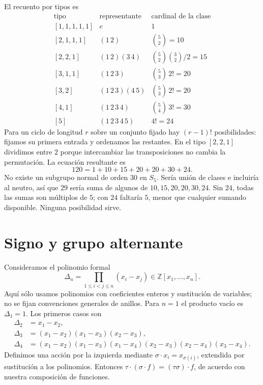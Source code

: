 \begin{ejem}\label{ejem:C9-S5}
El recuento por tipos es
\begingroup
\renewcommand{\arraystretch}{1.4}
\[
\begin{array}{c|c|c}
\text{tipo}&\text{representante}&\text{cardinal de la clase}\\\hline
{[1,1,1,1,1]}&e&1\\
{[2,1,1,1]}&(1\,2)&\binom52=10\\
{[2,2,1]}&(1\,2)(3\,4)&\binom52\binom32/2=15\\
{[3,1,1]}&(1\,2\,3)&\binom53\,2!=20\\
{[3,2]}&(1\,2\,3)(4\,5)&\binom53\,2!=20\\
{[4,1]}&(1\,2\,3\,4)&\binom54\,3!=30\\
{[5]}&(1\,2\,3\,4\,5)&4!=24
\end{array}
\]
\endgroup
Para un ciclo de longitud $r$ sobre un conjunto fijado hay $(r-1)!$ posibilidades: fijamos su primera entrada y ordenamos las restantes. En el tipo $[2,2,1]$ dividimos entre $2$ porque intercambiar las transposiciones no cambia la permutación. La ecuación resultante es
\[
120=1+10+15+20+20+30+24.
\]
No existe un subgrupo normal de orden $30$ en $S_5$. Sería unión de clases e incluiría al neutro, así que $29$ sería suma de algunos de $10,15,20,20,30,24$. Sin $24$, todas las sumas son múltiplos de $5$; con $24$ faltaría $5$, menor que cualquier sumando disponible. Ninguna posibilidad sirve.
\end{ejem}

\section{Signo y grupo alternante}
Consideramos el polinomio formal
\[
\Delta_n=\prod_{1\le i<j\le n}(x_i-x_j)\in\mathbb Z[x_1,\ldots,x_n].
\]
Aquí sólo usamos polinomios con coeficientes enteros y sustitución de variables; no se fijan convenciones generales de anillos. Para $n=1$ el producto vacío es $\Delta_1=1$. Los primeros casos son
\begin{align*}
\Delta_2&=x_1-x_2,\\
\Delta_3&=(x_1-x_2)(x_1-x_3)(x_2-x_3),\\
\Delta_4&=(x_1-x_2)(x_1-x_3)(x_1-x_4)
 (x_2-x_3)(x_2-x_4)(x_3-x_4).
\end{align*}
Definimos una acción por la izquierda mediante $\sigma\cdot x_i=x_{\sigma(i)}$, extendida por sustitución a los polinomios. Entonces $\tau\cdot(\sigma\cdot f)=(\tau\sigma)\cdot f$, de acuerdo con nuestra composición de funciones.


